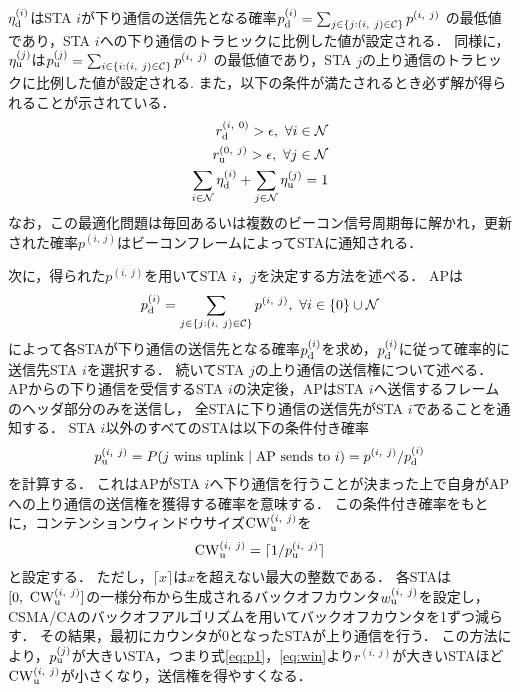 \documentclass[twocolumn, a4paper]{ieicejsp}
\newcommand{\sij}{(i,\ j)}
\newcommand{\mN}{{\mathcal N}}
\newcommand{\pij}{p^{(i,\ j)}}
\begin{document}
		$\eta_{\rm d}^{(i)}$はSTA $i$が下り通信の送信先となる確率$p_{\rm d}^{(i)}=\sum_{j\in\{j:(i,\ j)\in{\mathcal C}\}} p^{(i,\ j)}$
		の最低値であり，STA $i$への下り通信のトラヒックに比例した値が設定される．
		同様に，$\eta_{\rm u}^{(j)}$は$p_{\rm u}^{(j)}=\sum_{i\in\{i:(i,\ j)\in{\mathcal C}\}} p^{(i,\ j)}$
		の最低値であり，STA $j$の上り通信のトラヒックに比例した値が設定される.
		また，以下の条件が満たされるとき必ず解が得られることが示されている．
		\begin{align}
			r_{\rm d}^{(i,\ 0)} >\epsilon,\ \forall i\in\mN \\
			r_{\rm u}^{(0,\ j)} >\epsilon,\ \forall j\in\mN \\
			\sum_{i\in\mN}\eta_{\rm d}^{(i)} + \sum_{j\in\mN}\eta_{\rm u}^{(j)} =1 \label{eq:feasible}
		\end{align}
		なお，この最適化問題は毎回あるいは複数のビーコン信号周期毎に解かれ，更新された確率$\pij$はビーコンフレームによってSTAに通知される．
		\par
		次に，得られた$\pij$を用いてSTA $i$，$j$を決定する方法を述べる．
		APは
		\begin{equation}
			p_{\rm d}^{(i)}= \sum_{j\in\{j:(i,\ j)\in{\mathcal C}\}}p^{(i,\ j)},\ \forall i \in \{0\}\cup{\mathcal N}
		\end{equation}
		によって各STAが下り通信の送信先となる確率$p_{\rm d}^{(i)}$を求め，$p_{\rm d}^{(i)}$に従って確率的に送信先STA $i$を選択する．
		続いてSTA $j$の上り通信の送信権について述べる．
		APからの下り通信を受信するSTA $i$の決定後，APはSTA $i$へ送信するフレームのヘッダ部分のみを送信し，
		全STAに下り通信の送信先がSTA $i$であることを通知する．
		STA $i$以外のすべてのSTAは以下の条件付き確率
		\begin{equation}
			p_{\rm u}^{\sij} = P(j\ {\rm wins\ uplink}\mid{\rm AP\ sends\ to}\ i)=\pij / p_{\rm d}^{(i)} \label{eq:win}
		\end{equation}
		を計算する．
		これはAPがSTA $i$へ下り通信を行うことが決まった上で自身がAPへの上り通信の送信権を獲得する確率を意味する．
		この条件付き確率をもとに，コンテンションウィンドウサイズ${\rm CW}^{\sij}_{\rm u}$を
		\begin{equation}
			{\rm CW}^{\sij}_{\rm u} = \lceil 1/p_{\rm u}^{\sij} \rceil
		\end{equation}
		と設定する．
		ただし，$\lceil x \rceil$は$x$を超えない最大の整数である．
		各STAは$[0,\ {\rm CW}^{\sij}_{\rm u}]$の一様分布から生成されるバックオフカウンタ$w_{\rm u}^{\sij}$を設定し，
		CSMA/CAのバックオフアルゴリズムを用いてバックオフカウンタを1ずつ減らす．
		その結果，最初にカウンタが0となったSTAが上り通信を行う．
		この方法により，$p_{\rm u}^{(j)}$が大きいSTA，つまり式\eqref{eq:p1}，\eqref{eq:win}より$r^{\sij}$が大きいSTAほど${\rm CW}^{\sij}_{\rm u}$が小さくなり，送信権を得やすくなる．
\end{document}
